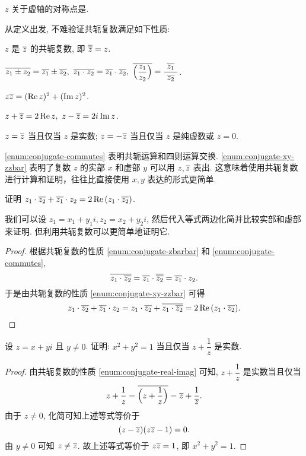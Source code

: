 \begin{exercise}
  $z$ 关于虚轴的对称点是\fillblank{}.
\end{exercise}

从定义出发, 不难验证共轭复数满足如下性质:
\begin{enumpar}
  \item $z$ 是 $\overline z$ 的共轭复数, 即 $\overline{\overline z}=z$.
  \label{enum:conjugate-zbarbar}
  \item $\ov{z_1\pm z_2}=\ov{z_1}\pm\ov{z_2},\ 
  \ov{z_1\cdot z_2}=\ov{z_1}\cdot\ov{z_2},\ 
  \ov{\Bigl(\dfrac{z_1}{z_2}\Bigr)}=\dfrac{~\ov{z_1}~}{~\ov{z_2}~}$.
  \label{enum:conjugate-commutes}
  \item $z\overline{z}=(\operatorname{Re} z)^2+(\operatorname{Im} z)^2$.
  \item $z+\overline z=2\operatorname{Re} z,\ z-\overline z=2i\operatorname{Im} z$.
  \label{enum:conjugate-xy-zzbar}
  \item $z=\overline z$ 当且仅当 $z$ 是实数; $z=-\overline z$ 当且仅当 $z$ 是纯虚数或 $z=0$.
  \label{enum:conjugate-real-imag}
\end{enumpar}\par\noindent
\ref{enum:conjugate-commutes} 表明共轭运算和四则运算交换.
\ref{enum:conjugate-xy-zzbar} 表明了复数 $z$ 的实部 $x$ 和虚部 $y$ 可以用 $z,\overline z$ 表出.
这意味着使用共轭复数进行计算和证明，往往比直接使用 $x,y$ 表达的形式更简单.

\begin{example}
  证明 $z_1\cdot\overline{z_2}+\overline{z_1}\cdot z_2=2\operatorname{Re}{(z_1\cdot\overline{z_2})}$.
\end{example}

我们可以设 $z_1=x_1+y_1i,z_2=x_2+y_2i$, 然后代入等式两边化简并比较实部和虚部来证明.
但利用共轭复数可以更简单地证明它.

\begin{proof}
  根据共轭复数的性质 \ref{enum:conjugate-zbarbar} 和 \ref{enum:conjugate-commutes},
  \[\overline{z_1\cdot\overline{z_2}}=\overline{z_1}\cdot\overline{\overline{z_2}}=\overline{z_1}\cdot z_2.\]
  于是由共轭复数的性质 \ref{enum:conjugate-xy-zzbar} 可得
    \[z_1\cdot\overline{z_2}+\overline{z_1}\cdot z_2
      =z_1\cdot\overline{z_2}+\overline{z_1\cdot\overline{z_2}}
      =2\operatorname{Re}{(z_1\cdot\overline{z_2})}.\]
\end{proof}

\begin{example}
  设 $z=x+yi$ 且 $y\neq 0$. 证明: $x^2+y^2=1$ 当且仅当 $z+\dfrac1z$ 是实数.
\end{example}
\begin{proof}
  由共轭复数的性质 \ref{enum:conjugate-real-imag} 可知, 
  $z+\dfrac1z$ 是实数当且仅当
    \[z+\frac1z=\overline{\Bigl(z+\frac1z\Bigr)}=\overline z+\frac1{\overline z}.\]
  由于 $z\neq 0$, 化简可知上述等式等价于
    \[(z-\overline z)(z\overline z-1)=0.\]
  由 $y\neq0$ 可知 $z\neq \overline z$.
  故上述等式等价于 $z\overline z=1$, 即 $x^2+y^2=1$.
\end{proof}


